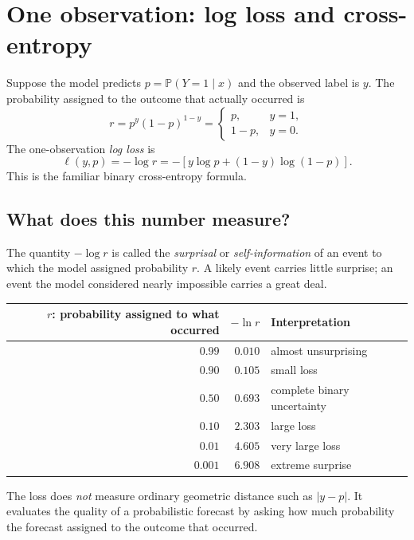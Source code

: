 \documentclass[11pt]{article}
\newcommand{\rowrule}{\specialrule{0.20pt}{1.25pt}{1.25pt}}
\newcommand{\Prob}{\mathbb{P}}
\theoremstyle{definition}
\begin{document}
\section{One observation: log loss and cross-entropy}

Suppose the model predicts $p=\Prob(Y=1\mid x)$ and the observed label is $y$. The probability assigned to the outcome that actually occurred is
\begin{equation}
r=p^y(1-p)^{1-y}
=
\begin{cases}
p,&y=1,\\
1-p,&y=0.
\end{cases}
\label{eq:correct-prob}
\end{equation}
The one-observation \emph{log loss} is
\begin{equation}
\ell(y,p)=-\log r
=-\left[y\log p+(1-y)\log(1-p)\right].
\label{eq:bce-one}
\end{equation}
This is the familiar binary cross-entropy formula.

\subsection{What does this number measure?}

The quantity $-\log r$ is called the \emph{surprisal} or \emph{self-information} of an event to which the model assigned probability $r$. A likely event carries little surprise; an event the model considered nearly impossible carries a great deal.

\begin{center}
\begin{tabular}{rrl}
\toprule
$r$: probability assigned to what occurred & $-\ln r$ & Interpretation \\
\midrule
$0.99$  & $0.010$ & almost unsurprising \\
\rowrule
$0.90$  & $0.105$ & small loss \\
\rowrule
$0.50$  & $0.693$ & complete binary uncertainty \\
\rowrule
$0.10$  & $2.303$ & large loss \\
\rowrule
$0.01$  & $4.605$ & very large loss \\
\rowrule
$0.001$ & $6.908$ & extreme surprise \\
\bottomrule
\end{tabular}
\end{center}

The loss does \emph{not} measure ordinary geometric distance such as $|y-p|$. It evaluates the quality of a probabilistic forecast by asking how much probability the forecast assigned to the outcome that occurred.
\end{document}
